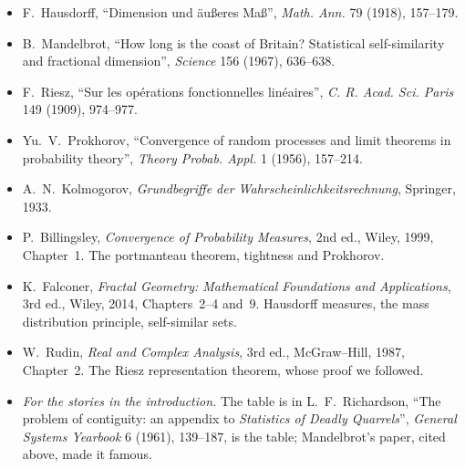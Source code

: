 \begin{itemize}
\item F.~Hausdorff, ``Dimension und \"au\ss eres Ma\ss'', \emph{Math. Ann.} 79 (1918), 157--179.
\item B.~Mandelbrot, ``How long is the coast of Britain? Statistical self-similarity and fractional dimension'', \emph{Science} 156 (1967), 636--638.
\item F.~Riesz, ``Sur les op\'erations fonctionnelles lin\'eaires'', \emph{C. R. Acad. Sci. Paris} 149 (1909), 974--977.
\item Yu.~V.~Prokhorov, ``Convergence of random processes and limit theorems in probability theory'', \emph{Theory Probab. Appl.} 1 (1956), 157--214.
\item A.~N.~Kolmogorov, \emph{Grundbegriffe der Wahrscheinlichkeitsrechnung}, Springer, 1933.
\item P.~Billingsley, \emph{Convergence of Probability Measures}, 2nd ed., Wiley, 1999, Chapter~1. The portmanteau theorem, tightness and Prokhorov.
\item K.~Falconer, \emph{Fractal Geometry: Mathematical Foundations and Applications}, 3rd ed., Wiley, 2014, Chapters~2--4 and~9. Hausdorff measures, the mass distribution principle, self-similar sets.
\item W.~Rudin, \emph{Real and Complex Analysis}, 3rd ed., McGraw--Hill, 1987, Chapter~2. The Riesz representation theorem, whose proof we followed.
\item \emph{For the stories in the introduction.} The table is in L.~F.~Richardson, ``The problem of contiguity: an appendix to \emph{Statistics of Deadly Quarrels}'', \emph{General Systems Yearbook}
6 (1961), 139--187, is the table; Mandelbrot's paper, cited above, made it famous.
\end{itemize}
